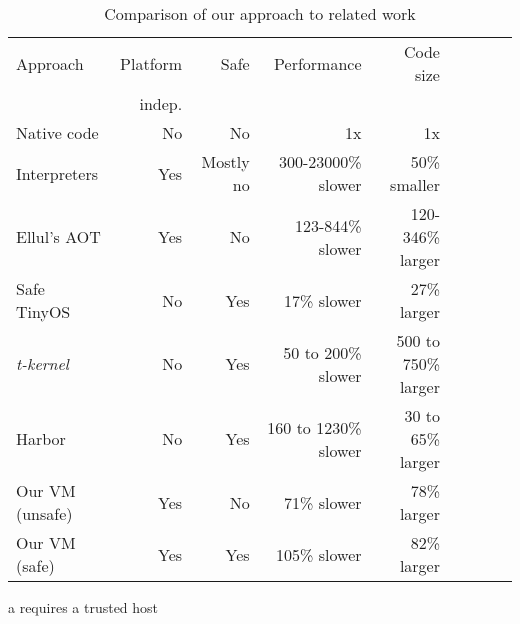 
\begin{table}
\caption{Comparison of our approach to related work}
\label{tbl-contribution-comparison}
    \begin{threeparttable}
    \begin{tabular}{lrrrrrrrr}
    \toprule
    Approach        & Platform    & Safe               & Performance           & Code size              \\
                    & indep.      &                    &                       & \\
    \midrule
    \midrule
    Native code     & No          & No                 & 1x                    & 1x                     \\
    Interpreters    & Yes         & Mostly no          & 300-23000\% slower    & ~50\% smaller          \\
    Ellul's AOT     & Yes         & No                 & 123-844\% slower      & 120-346\% larger       \\
    Safe TinyOS     & No          & Yes\tnote{a}       & 17\% slower           & 27\% larger            \\
    \emph{t-kernel} & No          & Yes                & 50 to 200\% slower    & 500 to 750\% larger    \\
    Harbor          & No          & Yes                & 160 to 1230\% slower  & 30 to 65\% larger      \\
    Our VM (unsafe) & Yes         & No                 & 71\% slower           & 78\% larger            \\ %
    Our VM (safe)   & Yes         & Yes                & 105\% slower          & 82\% larger            \\ %
    \bottomrule
    \end{tabular}
    \begin{tablenotes}
        \item[a] requires a trusted host
    \end{tablenotes}
    \end{threeparttable}
\end{table}
